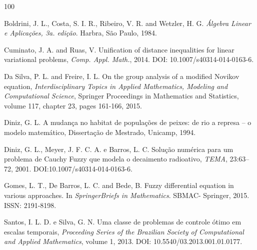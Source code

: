 \documentclass[12pt]{article}
\begin{document}
\begin{thebibliography}{100}

Boldrini, J. L., Costa, S. I. R., Ribeiro, V. R. and Wetzler, H. G. {\it Álgebra Linear e Aplicações, 3a. edição}. Harbra, São Paulo, 1984.

Cuminato, J. A. and Ruas, V. Unification of distance inequalities for linear variational problems, 
{\it Comp. Appl. Math.}, 2014. DOI: 10.1007/s40314-014-0163-6.
 
Da Silva, P. L. and Freire, I. L. On the group analysis of a modified Novikov equation, 
{\it Interdisciplinary Topics in Applied Mathematics, Modeling and Computational Science}, 
Springer Proceedings in Mathematics and Statistics,  volume 117, chapter 23, pages 161-166, 2015.

Diniz, G. L. A mudança no habitat de populações de peixes: de rio a represa -- o modelo 
matemático, Dissertação de Mestrado, Unicamp, 1994.

Diniz, G. L., Meyer, J. F. C. A. e Barros, L. C. Solução numérica para um problema de 
Cauchy Fuzzy que modela o decaimento radioativo, {\it TEMA},  23:63--72, 2001. DOI:10.1007/s40314-014-0163-6.

Gomes, L. T., De Barros, L. C. and Bede, B. Fuzzy differential equation in various approaches. 
In {\it SpringerBriefs in Mathematics}. SBMAC- Springer, 2015. ISSN: 2191-8198.



 Santos, I. L. D. e Silva, G. N. Uma classe de problemas de controle ótimo 
em escalas temporais, {\it Proceeding Series of the Brazilian Society of Computational and 
Applied Mathematics}, volume 1, 2013. DOI: 10.5540/03.2013.001.01.0177.

\end{thebibliography}


\end{document}
